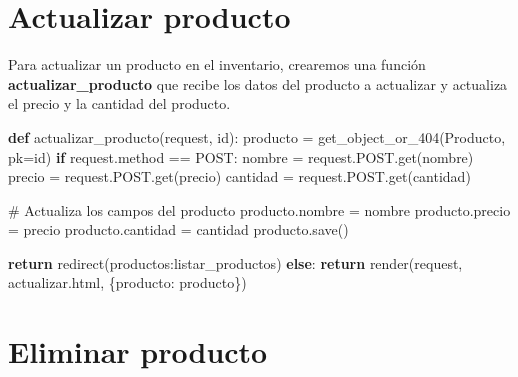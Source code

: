 \documentclass[
  a4paper,
  DIV=11,
  numbers=noendperiod,
  onepage,
  openany]{scrreprt}
\newenvironment{Shaded}{\begin{snugshade}}{\end{snugshade}}
\newcommand{\BuiltInTok}[1]{\textcolor[rgb]{0.00,0.23,0.31}{#1}}
\newcommand{\CommentTok}[1]{\textcolor[rgb]{0.37,0.37,0.37}{#1}}
\newcommand{\ControlFlowTok}[1]{\textcolor[rgb]{0.00,0.23,0.31}{\textbf{#1}}}
\newcommand{\KeywordTok}[1]{\textcolor[rgb]{0.00,0.23,0.31}{\textbf{#1}}}
\newcommand{\NormalTok}[1]{\textcolor[rgb]{0.00,0.23,0.31}{#1}}
\newcommand{\OperatorTok}[1]{\textcolor[rgb]{0.37,0.37,0.37}{#1}}
\newcommand{\StringTok}[1]{\textcolor[rgb]{0.13,0.47,0.30}{#1}}
\begin{document}
\begin{tcolorbox}
\section{Actualizar producto}\label{actualizar-producto}

Para actualizar un producto en el inventario, crearemos una función
\textbf{actualizar\_producto} que recibe los datos del producto a
actualizar y actualiza el precio y la cantidad del producto.

\begin{Shaded}
\begin{Highlighting}[]
\KeywordTok{def}\NormalTok{ actualizar\_producto(request, }\BuiltInTok{id}\NormalTok{):}
\NormalTok{    producto }\OperatorTok{=}\NormalTok{ get\_object\_or\_404(Producto, pk}\OperatorTok{=}\BuiltInTok{id}\NormalTok{)}
    \ControlFlowTok{if}\NormalTok{ request.method }\OperatorTok{==} \StringTok{\textquotesingle{}POST\textquotesingle{}}\NormalTok{:}
\NormalTok{        nombre }\OperatorTok{=}\NormalTok{ request.POST.get(}\StringTok{\textquotesingle{}nombre\textquotesingle{}}\NormalTok{)}
\NormalTok{        precio }\OperatorTok{=}\NormalTok{ request.POST.get(}\StringTok{\textquotesingle{}precio\textquotesingle{}}\NormalTok{)}
\NormalTok{        cantidad }\OperatorTok{=}\NormalTok{ request.POST.get(}\StringTok{\textquotesingle{}cantidad\textquotesingle{}}\NormalTok{)}
        
        \CommentTok{\# Actualiza los campos del producto}
\NormalTok{        producto.nombre }\OperatorTok{=}\NormalTok{ nombre}
\NormalTok{        producto.precio }\OperatorTok{=}\NormalTok{ precio}
\NormalTok{        producto.cantidad }\OperatorTok{=}\NormalTok{ cantidad}
\NormalTok{        producto.save()}
        
        \ControlFlowTok{return}\NormalTok{ redirect(}\StringTok{\textquotesingle{}productos:listar\_productos\textquotesingle{}}\NormalTok{)}
    \ControlFlowTok{else}\NormalTok{:}
        \ControlFlowTok{return}\NormalTok{ render(request, }\StringTok{\textquotesingle{}actualizar.html\textquotesingle{}}\NormalTok{, \{}\StringTok{\textquotesingle{}producto\textquotesingle{}}\NormalTok{: producto\})}
\end{Highlighting}
\end{Shaded}

\section{Eliminar producto}\label{eliminar-producto}


\end{tcolorbox}
\end{document}
